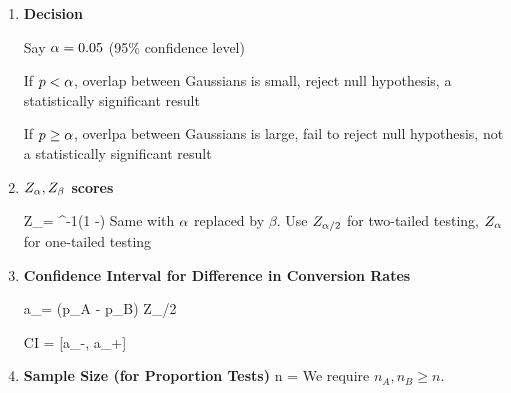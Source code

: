 \begin{enumerate}
\item {\bf Decision}

Say $\alpha=0.05$ (95\% confidence level)

If $p< \alpha$,  overlap between Gaussians is small, reject null hypothesis,
a statistically significant result

If $p \geq \alpha$, overlpa between Gaussians is large, fail to reject null hypothesis, not a statistically significant result

\item {\bf $Z_\alpha, Z_\beta$  scores}

\beq
Z_\alp=
\Phi^{-1}(1 -\alp)
\eeq
Same with $\alpha$ replaced by $\beta$.
Use $Z_{\alpha/2}$ for two-tailed testing, $Z_\alpha$ for one-tailed testing

\item {\bf Confidence Interval for Difference in Conversion Rates} 

\beq
a_\pm = (p_A - p_B) \pm Z_{\alpha/2} 
\eeq

\beq
CI = [a_-, a_+]
\eeq



\item {\bf Sample Size 
(for Proportion Tests)}
\beq
n = 
\eeq
We require $n_A, n_B\geq n$.

\end{enumerate}
